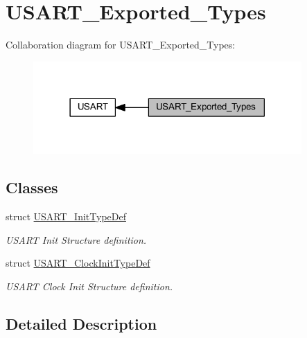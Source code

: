 \hypertarget{group___u_s_a_r_t___exported___types}{}\section{U\+S\+A\+R\+T\+\_\+\+Exported\+\_\+\+Types}
\label{group___u_s_a_r_t___exported___types}
Collaboration diagram for U\+S\+A\+R\+T\+\_\+\+Exported\+\_\+\+Types\+:
\nopagebreak
\begin{figure}[H]
\begin{center}
\leavevmode
\includegraphics[width=290pt]{group___u_s_a_r_t___exported___types}
\end{center}
\end{figure}
\subsection*{Classes}
\begin{DoxyCompactItemize}
\item 
struct \hyperlink{struct_u_s_a_r_t___init_type_def}{U\+S\+A\+R\+T\+\_\+\+Init\+Type\+Def}
\begin{DoxyCompactList}\small\item\em U\+S\+A\+RT Init Structure definition. \end{DoxyCompactList}\item 
struct \hyperlink{struct_u_s_a_r_t___clock_init_type_def}{U\+S\+A\+R\+T\+\_\+\+Clock\+Init\+Type\+Def}
\begin{DoxyCompactList}\small\item\em U\+S\+A\+RT Clock Init Structure definition. \end{DoxyCompactList}\end{DoxyCompactItemize}


\subsection{Detailed Description}
